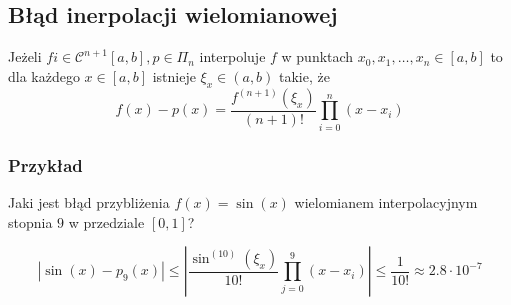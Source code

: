 \documentclass[../mn-notatki.tex]{subfiles}
\begin{document}




\subsection{Błąd inerpolacji wielomianowej}
\begin{tcolorbox}
Jeżeli $f i\in \mathcal{C}^{n+1}[a,b], p \in \Pi_n$ interpoluje $f$ w punktach
$x_0, x_1, \ldots, x_n \in [a,b]$ to dla każdego $x \in [a,b]$ istnieje
$\xi_x \in (a,b)$ takie, że
\[
f(x) - p(x) = \frac{f^{(n+1)}(\xi_x)}{(n+1)!} \prod_{i=0}^{n} (x-x_i)
\]
\end{tcolorbox}

\subsubsection{Przykład}

Jaki jest błąd przybliżenia $f(x) = \sin(x)$ wielomianem interpolacyjnym
stopnia $9$ w przedziale $[0,1]$?

\[
|\sin(x) - p_9(x)| \leqslant
\left| \frac{\sin^{(10)}(\xi_x)}{10!} \prod_{j=0}^{9} (x-x_i) \right|
\leqslant \frac{1}{10!} \approx 2.8 \cdot 10^{-7}
\]
\end{document}

